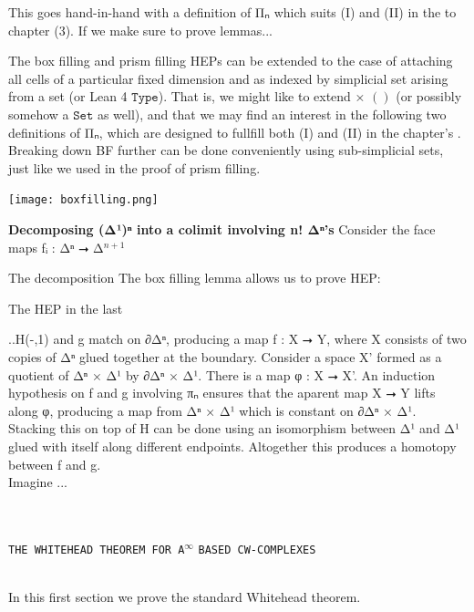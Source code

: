 \documentclass{book}
\theoremstyle{definition}
\begin{document}
This goes hand-in-hand with a definition of Π⃗ₙ which suits (I) and (II) in the  to chapter (3). If we make sure to prove lemmas... 

The box filling and prism filling HEPs can be extended to the case of attaching all cells of a particular fixed dimension and as indexed by simplicial set arising from a set (or Lean 4 $\texttt{Type}$). That is, we might like to extend × $()$ (or possibly somehow a $\texttt{Set}$ as well), and that we may find an interest in the following two definitions of Π⃗ₙ, which are designed to fullfill both (I) and (II) in the chapter's .\\

Breaking down BF further can be done conveniently using sub-simplicial sets, just like we used in the proof of prism filling. 

\begin{center}
\texttt{[image: boxfilling.png]}
\end{center}


{\bf Decomposing (Δ¹)ⁿ into a colimit involving n! Δⁿ's} Consider the face maps fᵢ : Δⁿ ⭢ Δ${}^{n+1}$


The decomposition 
The box filling lemma allows us to prove HEP:


The HEP in the last 

..H(-,1) and g match on ∂Δⁿ, producing a map f : X ⭢ Y, where X consists of two copies of Δⁿ glued together at the boundary. Consider a space X' formed as a quotient of Δⁿ × Δ¹ by ∂Δⁿ × Δ¹. There is a map φ : X ⭢ X'. An induction hypothesis on f and g involving πₙ ensures that the aparent map X ⭢ Y lifts along φ, producing a map from Δⁿ × Δ¹ which is constant on ∂Δⁿ × Δ¹. Stacking this on top of H can be done using an isomorphism between Δ¹ and Δ¹ glued with itself along different endpoints. Altogether this produces a homotopy between f and g.\\

Imagine ...
\fi


\newpage
{
\Huge 
\begin{center}
\ \\
\ \\
\texttt{THE WHITEHEAD THEOREM FOR A}${}^{\infty}$ \texttt{BASED CW-COMPLEXES}
\ \\
\ \\
\end{center}
\thispagestyle{empty}
}

\iffalse

In this first section we prove the standard Whitehead theorem.\\
\end{document}
